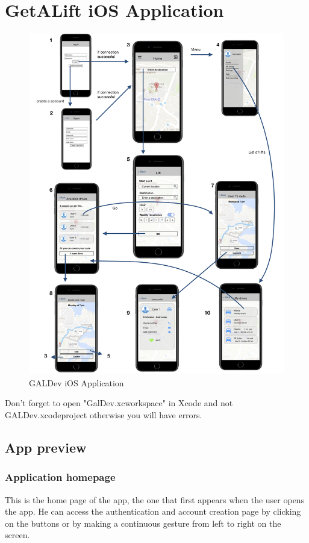 \section{GetALift iOS Application}
\begin{figure}[h!]
\begin{center}
\includegraphics[scale = 0.35]{diagrams/iOSApplication.png} 
\end{center}
\caption{GALDev iOS Application}
\end{figure}

Don't forget to open "GalDev.xcworkspace" in Xcode and not GALDev.xcodeproject otherwise you will have errors.

\subsection{App preview}

\subsubsection{Application homepage}
This is the home page of the app, the one that first appears when the user opens the app. He can access the authentication and account creation page by clicking on the buttons or by making a continuous gesture from left to right on the screen.

